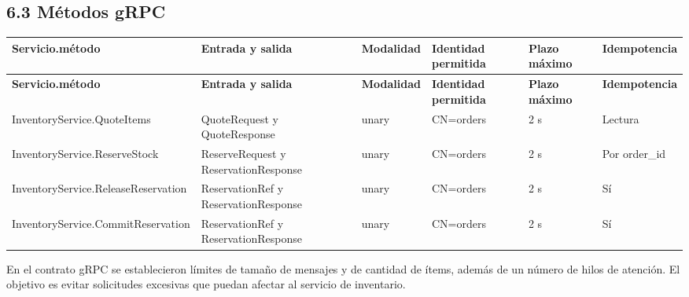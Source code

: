 \documentclass[10pt,letterpaper]{article}
\begin{document}
\subsection*{6.3 Métodos gRPC }
{\footnotesize
\begin{longtable}{|P{\tabcolsep\relax}|P{\tabcolsep\relax}|P{\tabcolsep\relax}|P{\tabcolsep\relax}|P{\tabcolsep\relax}|P{\tabcolsep\relax}|}
\hline
\textbf{Servicio.\allowbreak{}método} & \textbf{Entrada y salida} & \textbf{Modalidad} & \textbf{Identidad permitida} & \textbf{Plazo máximo} & \textbf{Idempotencia} \\ \hline
\endfirsthead
\hline
\textbf{Servicio.\allowbreak{}método} & \textbf{Entrada y salida} & \textbf{Modalidad} & \textbf{Identidad permitida} & \textbf{Plazo máximo} & \textbf{Idempotencia} \\ \hline
\endhead
InventoryService.\allowbreak{}QuoteItems & QuoteRequest y QuoteResponse & unary & CN=orders & 2 s & Lectura \\ \hline
InventoryService.\allowbreak{}ReserveStock & ReserveRequest y ReservationResponse & unary & CN=orders & 2 s & Por order\_\allowbreak{}id \\ \hline
InventoryService.\allowbreak{}ReleaseReservation & ReservationRef y ReservationResponse & unary & CN=orders & 2 s & Sí \\ \hline
InventoryService.\allowbreak{}CommitReservation & ReservationRef y ReservationResponse & unary & CN=orders & 2 s & Sí \\ \hline
\end{longtable}}
En el contrato gRPC se establecieron límites de tamaño de mensajes y de cantidad de ítems, además de un número de hilos de atención. El objetivo es evitar solicitudes excesivas que puedan afectar al servicio de inventario.
\end{document}
